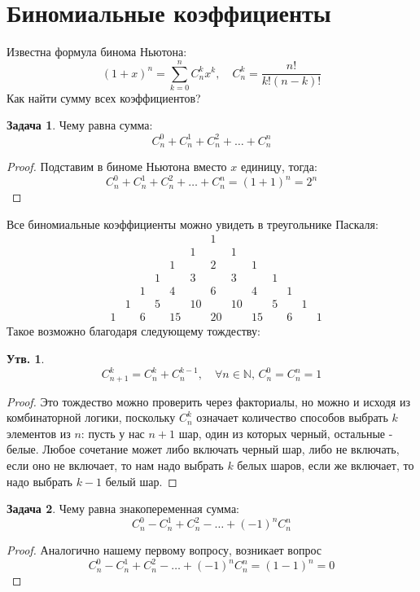 \documentclass[12pt]{article}
\newcommand{\MN}{\mathbb{N}}
\theoremstyle{definition}
\newtheorem{prop}{Утв.}
\newtheorem{problem}{Задача}
\newcommand{\ddsum}[2]{\displaystyle\sum\limits_{#1}^{#2}}
\begin{document}
\section*{Биномиальные коэффициенты}

Известна формула бинома Ньютона:
$$
	(1 + x)^n = \ddsum{k = 0}{n}C_n^kx^k, \quad C_n^k = \dfrac{n!}{k!(n-k)!}
$$ 
Как найти сумму всех коэффициентов? 
\begin{problem}
	Чему равна сумма:
	$$
		C_n^0 + C_n^1 + C_n^2 + \dotsc + C_n^n
	$$
\end{problem}
\begin{proof}
	Подставим в биноме Ньютона вместо $x$ единицу, тогда:
	$$
		C_n^0 + C_n^1 + C_n^2 + \dotsc + C_n^n = (1 + 1)^n = 2^n
	$$
\end{proof}

Все биномиальные коэффициенты можно увидеть в треугольнике Паскаля:
$$
	\begin{matrix}
		&&&&&&&1&&&&&&\\
		&&&&&&1&&1&&&&&\\
		&&&&&1&&2&&1&&&&\\
		&&&&1&&3&&3&&1&&&\\
		&&&1&&4&&6&&4&&1&&\\
		&&1&&5&&10&&10&&5&&1&\\
		&1&&6&&15&&20&&15&&6&&1
	\end{matrix}
$$
Такое возможно благодаря следующему тождеству:
\begin{prop}
	$$
		C_{n+1}^k = C_{n}^k + C_n^{k-1}, \quad \forall n \in \MN, \, C_n^0 = C_n^n = 1
	$$
\end{prop}
\begin{proof}
	Это тождество можно проверить через факториалы, но можно и исходя из комбинаторной логики, поскольку $C_n^k$ означает количество способов выбрать $k$ элементов из $n$: пусть у нас $n+1$ шар, один из которых черный, остальные - белые. Любое сочетание может либо включать черный шар, либо не включать, если оно не включает, то нам надо выбрать $k$ белых шаров, если же включает, то надо выбрать $k-1$ белый шар.
\end{proof}

\begin{problem}
	Чему равна знакопеременная сумма:
	$$
		C_n^0 - C_n^1 + C_n^2 - \dotsc + (-1)^nC_n^n
	$$
\end{problem}
\begin{proof}
	Аналогично нашему первому вопросу, возникает вопрос 
	$$
		C_n^0 - C_n^1 + C_n^2 - \dotsc + (-1)^nC_n^n = (1 - 1)^n = 0
	$$
\end{proof}
\end{document}
